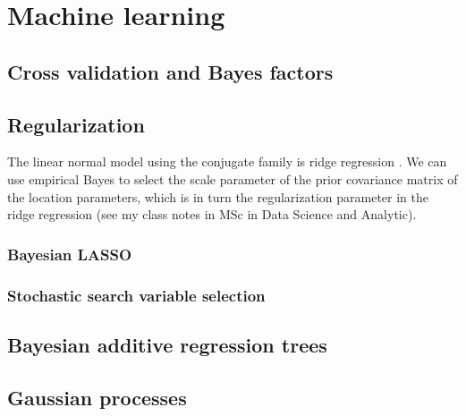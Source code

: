 \chapter{Machine learning}\label{chap13}

\section{Cross validation and Bayes factors}\label{sec13_1}

\section{Regularization}\label{sec13_2}
The linear normal model using the conjugate family is ridge regression \cite{Ishwaran2005}. We can use empirical Bayes to select the scale parameter of the prior covariance matrix of the location parameters, which is in turn the regularization parameter in the ridge regression (see my class notes in MSc in Data Science and Analytic).

\subsection{Bayesian LASSO}\label{sec13_21}

\subsection{Stochastic search variable selection}\label{sec13_22}

\section{Bayesian additive regression trees}\label{sec13_3}

\section{Gaussian processes}\label{13_4}